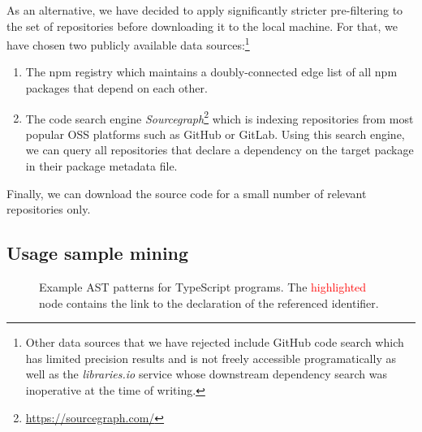As an alternative, we have decided to apply significantly stricter pre-filtering to the set of repositories before downloading it to the local machine.
For that, we have chosen two publicly available data sources:\footnote{
	Other data sources that we have rejected include GitHub code search which has limited precision results and is not freely accessible programatically as well as the \emph{libraries.io} service \citep{katz2020libraries} whose downstream dependency search was inoperative at the time of writing.%
}

\begin{enumerate}[label=(\roman*)]
	\item The npm registry which maintains a doubly-connected edge list of all npm packages that depend on each other.
	\item The code search engine \emph{Sourcegraph}\footnote{\url{https://sourcegraph.com/}} which is indexing repositories from most popular OSS platforms such as GitHub or GitLab.
		Using this search engine, we can query all repositories that declare a dependency on the target package in their package metadata file.
\end{enumerate}

Finally, we can download the source code for a small number of relevant repositories only.

\subsection{Usage sample mining}
\label{sec:approach/mining}

\begin{figure*}[htb!]
	\newcommand\lowlight[1]{\textcolor{gray}{#1}}
	\newcommand\highlight[1]{\textcolor{red}{#1}}
	\centering
	\begin{subfigure}[t]{.32\linewidth}
		
	\end{subfigure}
	\hfill
	\begin{subfigure}[t]{.32\linewidth}
		
	\end{subfigure}
	\hfill
	\begin{subfigure}[t]{.32\linewidth}
		
	\end{subfigure}

	\caption{Example AST patterns for TypeScript programs.
		The \highlight{highlighted} node contains the link to the declaration of the referenced identifier.
	}
	\label{fig:approach/mining/patterns}
\end{figure*}


